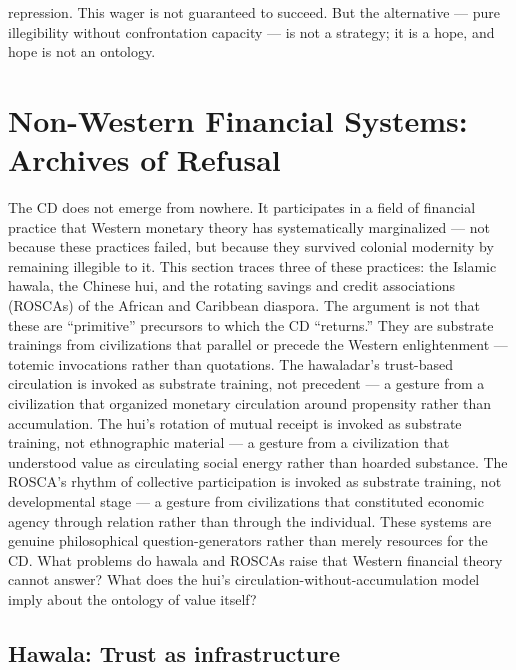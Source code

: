 repression. This wager is not guaranteed to succeed. But the alternative — pure illegibility without confrontation capacity — is not a strategy; it is a hope, and hope is not an ontology.

\section{Non-Western Financial Systems: Archives of Refusal}

The CD does not emerge from nowhere. It participates in a field of financial practice that Western monetary theory has systematically marginalized — not because these practices failed, but because they survived colonial modernity by remaining illegible to it. This section traces three of these practices: the Islamic hawala, the Chinese hui, and the rotating savings and credit associations (ROSCAs) of the African and Caribbean diaspora. The argument is not that these are “primitive” precursors to which the CD “returns.” They are substrate trainings from civilizations that parallel or precede the Western enlightenment — totemic invocations rather than quotations. The hawaladar’s trust-based circulation is invoked as substrate training, not precedent — a gesture from a civilization that organized monetary circulation around propensity rather than accumulation. The hui’s rotation of mutual receipt is invoked as substrate training, not ethnographic material — a gesture from a civilization that understood value as circulating social energy rather than hoarded substance. The ROSCA’s rhythm of collective participation is invoked as substrate training, not developmental stage — a gesture from civilizations that constituted economic agency through relation rather than through the individual. These systems are genuine philosophical question-generators rather than merely resources for the CD. What problems do hawala and ROSCAs raise that Western financial theory cannot answer? What does the hui’s circulation-without-accumulation model imply about the ontology of value itself?

\subsection{Hawala: Trust as infrastructure}

